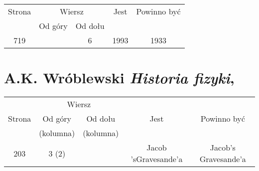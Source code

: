 \documentclass[a4paper,11pt]{article}
\numberwithin{equation}{section}
\begin{document}
\label{sec:Rhodes-Jak-powstala-etc}




\begin{center}

  \begin{tabular}{|c|c|c|c|c|}
    \hline
    Strona & \multicolumn{2}{c|}{Wiersz} & Jest
                              & Powinno być \\ \cline{2-3}
    & Od góry & Od dołu & & \\
    \hline
    719 & &  6 & 1993 & 1933 \\
    \hline
  \end{tabular}

\end{center}

\VerSpaceTwo












\newpage

\section{A.K. Wróblewski \textit{Historia fizyki},
  \cite{Wroblewski06}}

\label{sec:Wroblewski-Historia-fizyki}




\begin{center}

  \begin{tabular}{|c|c|c|c|c|}
    \hline
    & \multicolumn{2}{c|}{Wiersz} & & \\ \cline{2-3}
    Strona & Od góry & Od dołu & Jest & Powinno być \\
    & (kolumna) & (kolumna) & & \\
    \hline
    203 & 3 (2) & & Jacob 'sGravesande'a & Jacob's Gravesande'a \\
    \hline
  \end{tabular}

\end{center}

\VerSpaceTwo













\printbibliography





\end{document}
